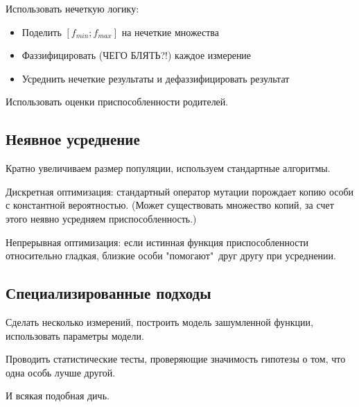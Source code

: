 Использовать нечеткую логику:
\begin{itemize}
    \item Поделить $[f_{min}; f_{max}]$ на нечеткие множества
    \item Фаззифицировать (ЧЕГО БЛЯТЬ?!) каждое измерение
    \item Усреднить нечеткие результаты и дефаззифицировать результат
\end{itemize}

Использовать оценки приспособленности родителей.


\subsection*{Неявное усреднение}

Кратно увеличиваем размер популяции, используем стандартные
алгоритмы.

Дискретная оптимизация: стандартный оператор мутации порождает
копию особи с константной вероятностью. (Может существовать
множество копий, за счет этого неявно усредняем приспособленность.)

Непрерывная оптимизация: если истинная функция приспособленности
относительно гладкая, близкие особи "помогают"\ друг другу при
усреднении.


\subsection*{Специализированные подходы}

Сделать несколько измерений, построить модель зашумленной функции,
использовать параметры модели.

Проводить статистические тесты, проверяющие значимость гипотезы
о том, что одна особь лучше другой.

И всякая подобная дичь.
